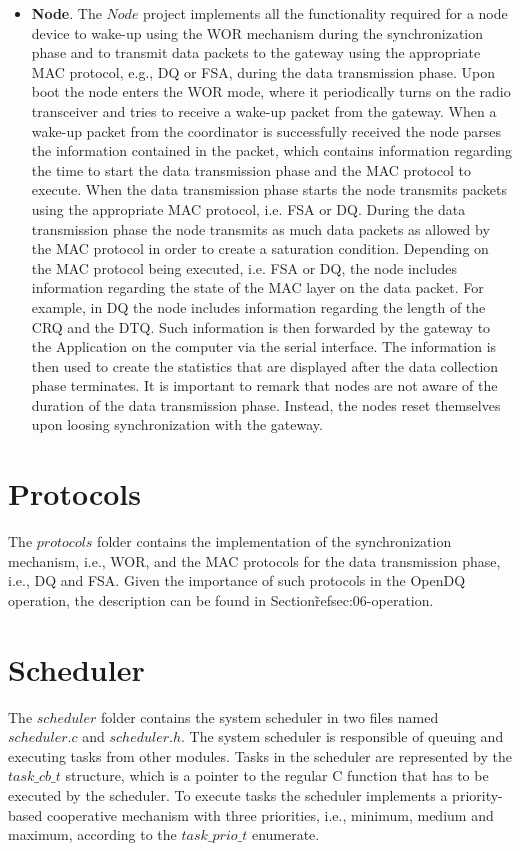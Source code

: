 \begin{itemize}
\item \textbf{Node}. The $Node$ project implements all the functionality required for a node device to wake-up using the WOR mechanism during the synchronization phase and to transmit data packets to the gateway using the appropriate MAC protocol, e.g., DQ or FSA, during the data transmission phase. Upon boot the node enters the WOR mode, where it periodically turns on the radio transceiver and tries to receive a wake-up packet from the gateway. When a wake-up packet from the coordinator is successfully received the node parses the information contained in the packet, which contains information regarding the time to start the data transmission phase and the MAC protocol to execute. When the data transmission phase starts the node transmits packets using the appropriate MAC protocol, i.e. FSA or DQ. During the data transmission phase the node transmits as much data packets as allowed by the MAC protocol in order to create a saturation condition. Depending on the MAC protocol being executed, i.e. FSA or DQ, the node includes information regarding the state of the MAC layer on the data packet. For example, in DQ the node includes information regarding the length of the CRQ and the DTQ. Such information is then forwarded by the gateway to the Application on the computer via the serial interface. The information is then used to create the statistics that are displayed after the data collection phase terminates. It is important to remark that nodes are not aware of the duration of the data transmission phase. Instead, the nodes reset themselves upon loosing synchronization with the gateway.
\end{itemize}

\section{Protocols}
The $protocols$ folder contains the implementation of the synchronization mechanism, i.e., WOR, and the MAC protocols for the data transmission phase, i.e., DQ and FSA. Given the importance of such protocols in the OpenDQ operation, the description can be found in Section\~ref{sec:06-operation}.

\section{Scheduler}
The $scheduler$ folder contains the system scheduler in two files named $scheduler.c$ and $scheduler.h$. The system scheduler is responsible of queuing and executing tasks from other modules. Tasks in the scheduler are represented by the $task\_cb\_t$ structure, which is a pointer to the regular C function that has to be executed by the scheduler. To execute tasks the scheduler implements a priority-based cooperative mechanism with three priorities, i.e., minimum, medium and maximum, according to the $task\_prio\_t$ enumerate.

